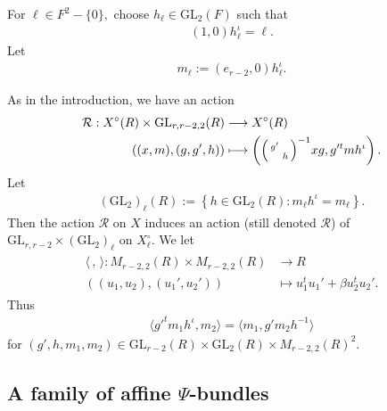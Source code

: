 \documentclass[12pt]{amsart}
\theoremstyle{remark}
\numberwithin{equation}{section}
\newcommand{\GL}{\mathrm{GL}}
\newcommand{\lto}{\longrightarrow}
\newcommand{\quash}[1]{}
\theoremstyle{definition}
\newenvironment{psmatrix}
  {\left(\begin{smallmatrix}}
  {\end{smallmatrix}\right)}
\numberwithin{equation}{subsection}
\begin{document}
For $\ell \in F^2-\{0\},$  
choose $h_\ell \in \mathrm{GL}_2(F)$ such that 
\begin{align} \label{hl} 
(1,0)h_{\ell}^\iota=\ell .
\end{align}
Let 
\begin{align}
m_{\ell}:=(e_{r-2},0)h_\ell^{\iota}.
\end{align}\quash{
We note that while $h_\ell$ is only unique up to left multiplication by $\begin{psmatrix}
    1 & \\
     & -1
\end{psmatrix}$, $m_{\ell}$ only depends on $\ell$.}



As in the introduction, we have an action 
\begin{align*}
 \mathcal{R}:   X^\circ(R) \times \GL_{r,r-2,2}(R) &\lto X^\circ(R)\\
    ((x,m),(g,g',h)) &\longmapsto \left( \begin{psmatrix} g' & \\ & h \end{psmatrix}^{-1}xg,g'^tmh^{\iota}\right).
\end{align*}
Let 
\begin{align*}
    (\GL_2)_{\ell}(R):=\left\{h \in \GL_2(R): m_\ell h^{\iota}=m_\ell\right\}.
\end{align*}
Then the action  $\mathcal{R}$ on $X$ induces an action (still denoted $\mathcal{R}$) of $\GL_{r,r-2}\times (\GL_2)_{\ell}$ on $X_{\ell}^\circ.$
We let \index{$\langle\,,\,\rangle$}
\begin{align*}\begin{split}
\langle\,,\,\rangle:M_{r-2,2}(R) \times M_{r-2,2}(R) &\lto R\\
((u_1,u_2),(u_1',u_2')) &\longmapsto u_1^tu_1'+\beta u_2^tu_2'. \end{split}
\end{align*}
Thus 
\begin{align} \label{M:pair:equiv}
\langle g'^tm_1h^{\iota},m_2\rangle=\langle m_1,g'm_2h^{-1} \rangle
\end{align}
for $(g',h,m_1,m_2) \in \GL_{r-2}(R) \times \GL_2(R) \times M_{r-2,2}(R)^2.$

\subsection{A family of affine $\Psi$-bundles}\label{ssec:fs}
\end{document}
